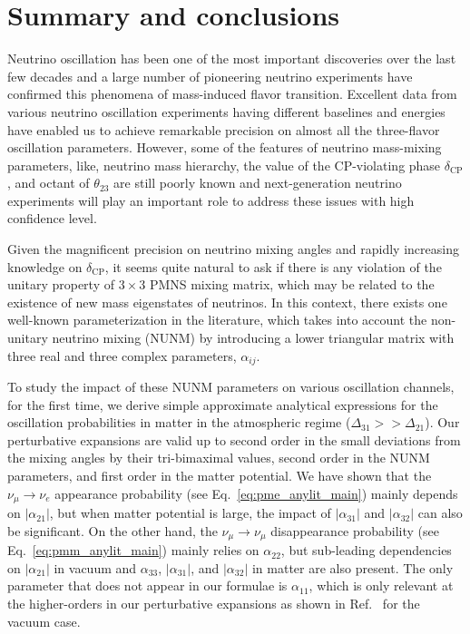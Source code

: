 \documentclass[11pt,a4paper]{article}
\begin{document}
\section{Summary and conclusions}
\label{sec:conclusion}
Neutrino oscillation has been one of the most important discoveries over the last few decades and a large number of pioneering neutrino experiments have confirmed this phenomena of mass-induced flavor transition. 
Excellent data from various neutrino oscillation experiments having different baselines and energies have enabled us to achieve remarkable precision on almost all the three-flavor oscillation parameters.
 However, some of the features of neutrino mass-mixing parameters, like, neutrino mass hierarchy, the value of the CP-violating phase $\delta_{\mathrm{CP}}$, and octant of $\theta_{23}$ are still poorly known and next-generation neutrino experiments will play an important role to address these issues with high confidence level.
 
Given the magnificent precision on neutrino mixing angles and rapidly increasing knowledge on $\delta_{\mathrm{CP}}$, 
it seems quite natural to ask if there is any violation of the unitary property of $3\times 3$ PMNS mixing matrix, which may be related to the existence of new mass eigenstates of neutrinos.
In this context, there exists one well-known parameterization in the literature, which takes into account the non-unitary neutrino mixing (NUNM) by introducing a lower triangular matrix with three real and three complex parameters, $\alpha_{ij}$.

To study the impact of these NUNM parameters on various oscillation channels, for the first time, we derive simple 
approximate analytical expressions for the oscillation probabilities in matter in the atmospheric regime ($\Delta_{31}>>\Delta_{21}$).
Our perturbative expansions are valid up to second order in the small deviations from the mixing angles by their tri-bimaximal values, second order in the NUNM parameters, and first order in the matter potential. We have shown that the $\nu_{\mu}\rightarrow\nu_e$ appearance probability (see Eq.~\ref{eq:pme_anylit_main}) mainly depends on $|\alpha_{21}|$, but when matter potential is large, the impact of $|\alpha_{31}|$ and $|\alpha_{32}|$ can also be significant. On the other hand, the $\nu_{\mu}\rightarrow\nu_{\mu}$ disappearance probability (see Eq.~\ref{eq:pmm_anylit_main}) mainly relies on $\alpha_{22}$, but sub-leading dependencies on $|\alpha_{21}|$ in vacuum and $\alpha_{33}$, $|\alpha_{31}|$, and $|\alpha_{32}|$ in matter are also present. The only parameter that does not appear in our formulae is $\alpha_{11}$, which is only relevant at the higher-orders in our perturbative expansions  as shown in Ref.~\cite{Escrihuela:2015wra} for the vacuum case.
\end{document}
